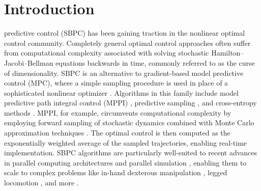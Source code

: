 \documentclass[letterpaper, 10 pt, conference]{ieeeconf}
\begin{document}
\section{Introduction}
 predictive control (SBPC) has been gaining traction in the nonlinear optimal control community. Completely general optimal control approaches often suffer from computational complexity associated with solving stochastic Hamilton--Jacobi--Bellman equations backwards in time, commonly referred to as the curse of dimensionality. SBPC is an alternative to gradient-based model predictive control (MPC), where a simple sampling procedure is used in place of a sophisticated nonlinear optimizer \cite{posa2014direct, kurtz2023inverse, aydinoglu2024consensus}. Algorithms in this family include model predictive path integral control (MPPI) \cite{williams2016aggressive}, predictive sampling \cite{howell2022predictive}, and cross-entropy methods \cite{rubinstein1999cross}. MPPI, for example, circumvents computational complexity by employing forward sampling of stochastic dynamics combined with Monte Carlo approximation techniques \cite{williams2017model}. The optimal control is then computed as the exponentially weighted average of the sampled trajectories, enabling real-time implementation.
SBPC algorithms are particularly well-suited to recent advances in parallel computing architectures and parallel simulation \cite{mjx, Genesis, makoviychuk2021isaac}, enabling them to scale to complex problems like in-hand dexterous manipulation \cite{li2025drop}, legged locomotion \cite{xue2025full}, and more \cite{kurtz2024hydrax, howell2022predictive}.
\end{document}
